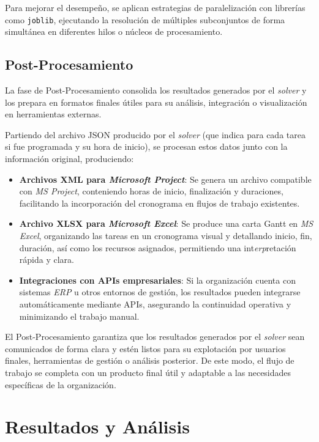 \documentclass{article}
\begin{document}
Para mejorar el desempeño, se aplican estrategias de paralelización con librerías como \texttt{joblib}, ejecutando la resolución de múltiples subconjuntos de forma simultánea en diferentes hilos o núcleos de procesamiento.


\subsection{Post-Procesamiento}

La fase de Post-Procesamiento consolida los resultados generados por el \textit{solver} y los prepara en formatos finales útiles para su análisis, integración o visualización en herramientas externas.

Partiendo del archivo JSON producido por el \textit{solver} (que indica para cada tarea si fue programada y su hora de inicio), se procesan estos datos junto con la información original, produciendo:

\begin{itemize}
    \item \textbf{Archivos XML para \textit{Microsoft Project}}: Se genera un archivo compatible con \textit{MS Project}, conteniendo horas de inicio, finalización y duraciones, facilitando la incorporación del cronograma en flujos de trabajo existentes.

    \item \textbf{Archivo XLSX para \textit{Microsoft Excel}}: Se produce una carta Gantt en \textit{MS Excel}, organizando las tareas en un cronograma visual y detallando inicio, fin, duración, así como los recursos asignados, permitiendo una int\textit{erp}retación rápida y clara.

    \item \textbf{Integraciones con APIs empresariales}: Si la organización cuenta con sistemas \textit{ERP} u otros entornos de gestión, los resultados pueden integrarse automáticamente mediante APIs, asegurando la continuidad operativa y minimizando el trabajo manual.
\end{itemize}

El Post-Procesamiento garantiza que los resultados generados por el \textit{solver} sean comunicados de forma clara y estén listos para su explotación por usuarios finales, herramientas de gestión o análisis posterior. De este modo, el flujo de trabajo se completa con un producto final útil y adaptable a las necesidades específicas de la organización.

\section{Resultados y Análisis}
\end{document}
